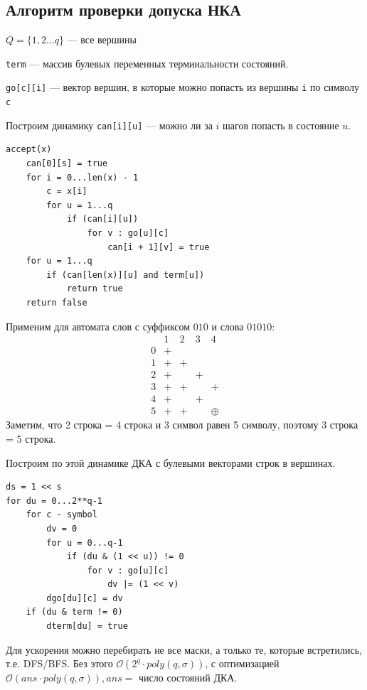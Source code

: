 \subsection*{Алгоритм проверки допуска НКА}

$Q=\{1, 2\ldots q\}$ --- все вершины

\texttt{term} --- массив булевых переменных терминальности состояний.

\texttt{go[c][i]} --- вектор вершин, в которые можно попасть из вершины \texttt{i} по символу \texttt{c}

Построим динамику \texttt{can[i][u]} --- можно ли за $i$ шагов попасть в состояние $u$.

\begin{verbatim}
accept(x)
    can[0][s] = true
    for i = 0...len(x) - 1
        c = x[i]
        for u = 1...q
            if (can[i][u])
                for v : go[u][c]
                    can[i + 1][v] = true
    for u = 1...q
        if (can[len(x)][u] and term[u])
            return true
    return false
\end{verbatim}

Применим для автомата слов с суффиксом $010$ и слова $01010$:
$$\begin{array}{c|cccc}
    & 1 & 2 & 3 & 4 \\
    \hline
    0 & + \\
    1 & + & + \\
    2 & + &  & + \\
    3 & + & + & & + \\
    4 & + & & + \\
    5 & + & + & & \oplus
\end{array}$$
Заметим, что 2 строка = 4 строка и 3 символ равен 5 символу, поэтому 3 строка = 5 строка.

Построим по этой динамике ДКА с булевыми векторами строк в вершинах.

\begin{verbatim}
ds = 1 << s
for du = 0...2**q-1
    for c - symbol
        dv = 0
        for u = 0...q-1
            if (du & (1 << u)) != 0
                for v : go[u][c]
                    dv |= (1 << v)
        dgo[du][c] = dv
    if (du & term != 0)
        dterm[du] = true
\end{verbatim}

Для ускорения можно перебирать не все маски, а только те, которые встретились, т.е. DFS/BFS. Без этого $\mathcal O(2^q\cdot poly(q, \sigma))$, с оптимизацией $\mathcal O(ans\cdot poly(q, \sigma)), ans=$ число состояний ДКА.

